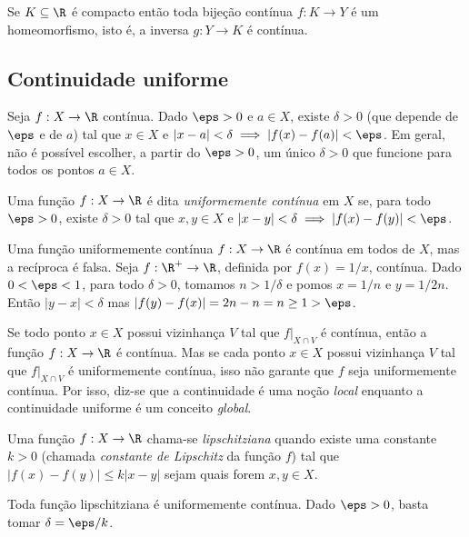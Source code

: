 \documentclass{article}
\begin{document}
\begin{prop}
    Se \(K \subseteq \R\) é compacto então toda bijeção contínua \(f: K \to Y\) é um homeomorfismo, isto é, a inversa \(g: Y \to K\) é contínua.
\end{prop}

\subsection{Continuidade uniforme}

Seja \(f: X \to \R\) contínua. Dado \(\eps > 0\) e \(a \in X\), existe \(\delta > 0\) (que depende de \(\eps\) e de \(a\)) tal que \(x \in X\) e \(|x - a| < \delta \implies |f(x) - f(a)| < \eps\). Em geral, não é possível escolher, a partir do \(\eps>0\), um único \(\delta >0\) que funcione para todos os pontos \(a \in X\).

\begin{defn}
    Uma função \(f: X \to \R\) é dita \emph{uniformemente contínua} em \(X\) se, para todo \(\eps > 0\), existe \(\delta > 0\) tal que \(x, y \in X\) e \(|x - y| < \delta \implies |f(x) - f(y)| < \eps\).
\end{defn}

\begin{rem}
    Uma função uniformemente contínua \(f: X \to \R\) é contínua em todos de \(X\), mas a recíproca é falsa. Seja \(f: \R^{+} \to \R\), definida por \(f(x)=1/x\), contínua. Dado \(0<\eps<1\), para todo \(\delta > 0\), tomamos \(n>1/\delta\) e pomos \(x=1/n\) e \(y=1/2n\). Então \(\vert y-x \vert < \delta\) mas \(\vert f(y)-f(x) \vert = 2n-n = n \geq 1 > \eps\).
\end{rem}

Se todo ponto \(x \in X\) possui vizinhança \(V\) tal que \(f|_{X \cap V}\) é contínua, então a função \(f: X \to \R\) é contínua. Mas se cada ponto \(x \in X\) possui vizinhança \(V\) tal que \(f|_{X \cap V}\) é uniformemente contínua, isso não garante que \(f\) seja uniformemente contínua.
Por isso, diz-se que a continuidade é uma noção \emph{local} enquanto a continuidade uniforme é um conceito \emph{global}.

\begin{defn}
    Uma função \(f: X \to \R\) chama-se \emph{lipschitziana} quando existe uma constante \(k>0\) (chamada \emph{constante de Lipschitz} da função \(f\)) tal que \(\vert f(x)-f(y) \vert \leq k\vert x - y \vert\) sejam quais forem \(x,y \in X\).
\end{defn}

\begin{rem}
    Toda função lipschitziana é uniformemente contínua. Dado \(\eps>0\), basta tomar \(\delta = \eps/k\).
\end{rem}
\end{document}
